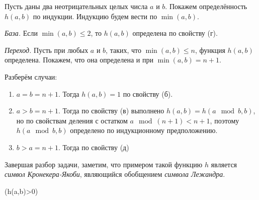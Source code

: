 \begin{enumerate}
Пусть даны два неотрицательных целых числа $a$ и $b$. Покажем определённость $h(a,b)$
по индукции. Индукцию будем вести по $\min(a,b)$.

\emph{База.} Если $\min(a,b) \le 2$, то $h(a,b)$ определена по свойству (г).

\emph{Переход.} Пусть при любых $a$ и $b$, таких, что $\min(a,b) \le n$, функция 
$h(a,b)$ определена. Покажем, что она определена и при $\min(a,b) = n+1$.

Разберём случаи:
\begin{enumerate}
\item $a = b = n+1$. Тогда $h(a,b) = 1$ по свойству (б).
\item $a > b = n+1$. Тогда по свойству (в) выполнено $h(a,b) = h(a \mod b, b)$,
но по свойствам деления с остатком $a \mod (n+1) < n+1$, поэтому $h(a \mod b, b)$
определено по индукционному предположению.
\item $b > a = n+1$. Тогда по свойству (д) 
\end{enumerate}

Завершая разбор задачи, заметим, что примером такой функцию $h$ является 
\emph{символ Кронекера-Якоби}, являющийся обобщением \emph{символа Лежандра}.


(h(a,b)>0)











\end{enumerate}
